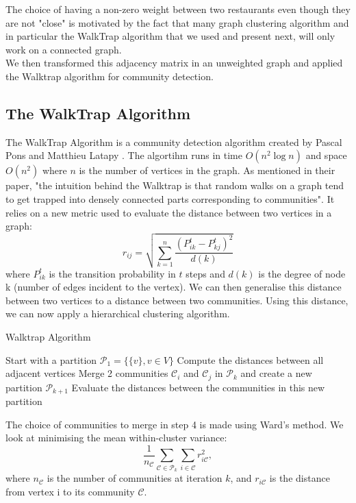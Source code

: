 \documentclass[twoside]{article}
\begin{document}
\begin{multicols}{2}
\noindent The choice of having a non-zero weight between two restaurants even though they are not "close" is motivated by the fact that many graph clustering algorithm and in particular the WalkTrap algorithm that we used and present next, will only work on a connected graph.\\

\noindent We then transformed this adjacency matrix in an unweighted graph and applied the Walktrap algorithm for community detection.\\

\subsection{The WalkTrap Algorithm}
The WalkTrap Algorithm is a community detection algorithm created by Pascal Pons and Matthieu Latapy \cite{Gr}. The algortihm runs in time $O(n^2\log n)$ and space $O(n^2)$ where $n$ is the number of vertices in the graph. As mentioned in their paper, "the intuition behind the Walktrap is that random walks on a graph tend to get trapped into densely connected parts corresponding to communities".\cite{Gr} It relies on a new metric used to evaluate the distance between two vertices in a graph:
 $$r_{ij} = \sqrt{\sum\limits_{k=1}^{n}\frac{(P^t_{ik}-P^t_{kj})^2}{d(k)}}$$
 where $P^t_{ik}$ is the transition probability in $t$ steps and $d(k)$ is the degree of node k (number of edges incident to the vertex). We can then generalise this distance between two vertices to a distance between two communities. Using this distance, we can now apply a hierarchical clustering algorithm.

\begin{algorithm}[H]
\caption{Walktrap Algorithm}\label{euclid}
\begin{algorithmic}[1]
\State Start with a partition $\mathcal{P}_1=\{\{v\}, v \in V\}$
\State Compute the distances between all adjacent vertices
\State Merge 2 communities $\mathcal{C}_i$ and $\mathcal{C}_j$ in $\mathcal{P}_k$ and create a new partition $\mathcal{P}_{k+1}$
\State Evaluate the distances between the communities in this new partition
\EndWhile
\end{algorithmic}
\end{algorithm}

\noindent The choice of communities to merge in step 4 is made using Ward's method. We look at minimising the mean within-cluster variance:
$$\frac{1}{n_\mathcal{C}}\sum\limits_{\mathcal{C}\in\mathcal{P}_{k}}\sum\limits_{i\in\mathcal{C}}r^2_{i\mathcal{C}},$$
\noindent where $n_\mathcal{C}$ is the number of communities at iteration $k$, and $r_{i\mathcal{C}}$ is the distance from vertex i to its community $\mathcal{C}$.\\


\end{multicols}
\end{document}
